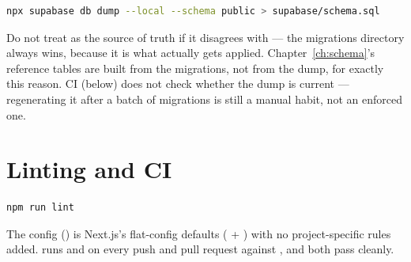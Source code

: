 \begin{lstlisting}[style=olkcodebash, language=bash, caption={Regenerating the schema dump against the local database}]
npx supabase db dump --local --schema public > supabase/schema.sql
\end{lstlisting}

\begin{olkwarn}
Do not treat  as the source of truth if it disagrees with  — the migrations directory always wins, because it is what actually gets applied. Chapter~\ref{ch:schema}'s reference tables are built from the migrations, not from the dump, for exactly this reason. CI (below) does not check whether the dump is current — regenerating it after a batch of migrations is still a manual habit, not an enforced one.
\end{olkwarn}

\section{Linting and CI}

\begin{lstlisting}[style=olkcodebash, language=bash, caption={Running the linter}]
npm run lint
\end{lstlisting}

The config () is Next.js's flat-config defaults ( + ) with no project-specific rules added.  runs  and  on every push and pull request against , and both pass cleanly.


